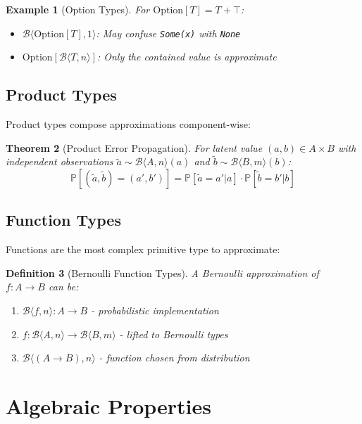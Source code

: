 \documentclass[11pt,final,hidelinks]{article}
\newtheorem{theorem}{Theorem}[section]
\newtheorem{definition}[theorem]{Definition}
\newtheorem{example}[theorem]{Example}
\newcommand{\bernoulli}[2]{\mathcal{B}\langle #1, #2 \rangle}
\newcommand{\Prob}[1]{\mathbb{P}\left[#1\right]}
\begin{document}
\begin{example}[Option Types]
For $\text{Option}[T] = T + \top$:
\begin{itemize}
    \item $\bernoulli{\text{Option}[T]}{1}$: May confuse \texttt{Some(x)} with \texttt{None}
    \item $\text{Option}[\bernoulli{T}{n}]$: Only the contained value is approximate
\end{itemize}
\end{example}

\subsection{Product Types}

Product types compose approximations component-wise:

\begin{theorem}[Product Error Propagation]
For latent value $(a, b) \in A \times B$ with independent observations $\tilde{a} \sim \bernoulli{A}{n}(a)$ and $\tilde{b} \sim \bernoulli{B}{m}(b)$:
\begin{equation}
\Prob{(\tilde{a}, \tilde{b}) = (a', b')} = \Prob{\tilde{a} = a' | a} \cdot \Prob{\tilde{b} = b' | b}
\end{equation}
\end{theorem}

\subsection{Function Types}

Functions are the most complex primitive type to approximate:

\begin{definition}[Bernoulli Function Types]
A Bernoulli approximation of $f: A \to B$ can be:
\begin{enumerate}
    \item $\bernoulli{f}{n}: A \to B$ - probabilistic implementation
    \item $f: \bernoulli{A}{n} \to \bernoulli{B}{m}$ - lifted to Bernoulli types
    \item $\bernoulli{(A \to B)}{n}$ - function chosen from distribution
\end{enumerate}
\end{definition}

\section{Algebraic Properties}
\end{document}

